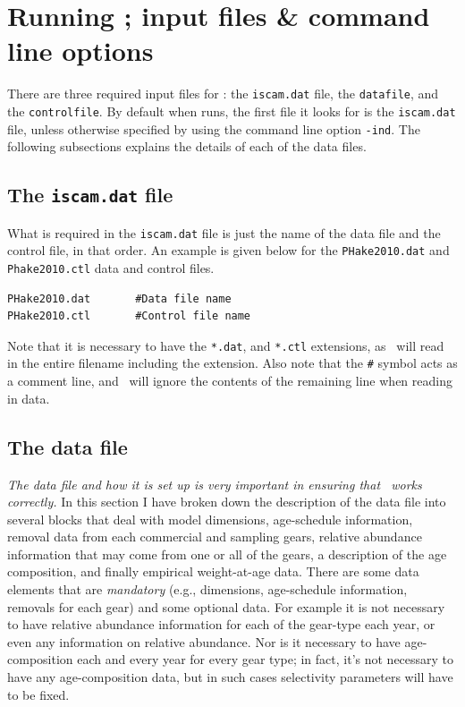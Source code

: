 
\section{Running \iscam; input files \& command line options}
\begin{multicols}{2}


There are three required input files for \iscam: the \verb"iscam.dat" file, the \verb"datafile", and the \verb"controlfile".  By default when \iscam runs, the first file it looks for is the \verb"iscam.dat" file, unless otherwise specified by using the command line option \verb"-ind".  The following subsections explains the details of each of the data files.


\subsection{The \texttt{iscam.dat} file}
What is required in the \verb"iscam.dat" file is just the name of the data file and the control file, in that order.  An example is given below for the \texttt{PHake2010.dat} and \texttt{Phake2010.ctl} data and control files.
\begin{verbatim}
PHake2010.dat		#Data file name
PHake2010.ctl		#Control file name
\end{verbatim}
Note that it is necessary to have the \verb"*.dat", and \verb"*.ctl" extensions, as \iscam\ will read in the entire filename including the extension.  Also note that the \verb"#" symbol acts as a comment line, and \iscam\ will ignore the contents of the remaining line when reading in data.

\subsection{The data file}
\emph{The data file and how it is set up is very important in ensuring that \iscam\ works correctly.}  In this section I have broken down the description of the data file into several blocks that deal with model dimensions, age-schedule information, removal data from each commercial and sampling gears, relative abundance information that may come from one or all of the gears,  a description of the age composition, and finally empirical weight-at-age data.  There are some data elements that are \emph{mandatory} (e.g., dimensions, age-schedule information, removals for each gear) and some optional data.  For example it is not necessary to have relative abundance information for each of the gear-type each year, or even any information on relative abundance.  Nor is it necessary to have age-composition each and every year for every gear type; in fact, it's not necessary to have any age-composition data, but in such cases selectivity parameters will have to be fixed.



\end{multicols}
